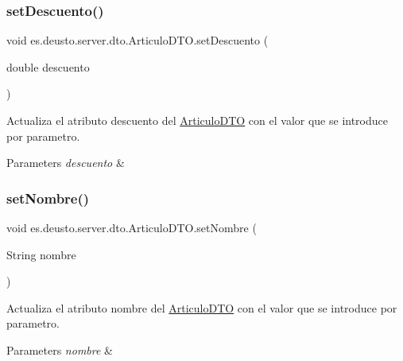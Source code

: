 \subsubsection{\texorpdfstring{setDescuento()}{setDescuento()}}
{\footnotesize\ttfamily void es.\+deusto.\+server.\+dto.\+Articulo\+D\+T\+O.\+set\+Descuento (\begin{DoxyParamCaption}\item[{double}]{descuento }\end{DoxyParamCaption})}

Actualiza el atributo descuento del \mbox{\hyperlink{classes_1_1deusto_1_1server_1_1dto_1_1_articulo_d_t_o}{Articulo\+D\+TO}} con el valor que se introduce por parametro. 
\begin{DoxyParams}{Parameters}
{\em descuento} & \\
\hline
\end{DoxyParams}
\mbox{\label{classes_1_1deusto_1_1server_1_1dto_1_1_articulo_d_t_o_a9e9a4e45fb1538231674660fcb5ca4e1}} 
\subsubsection{\texorpdfstring{setNombre()}{setNombre()}}
{\footnotesize\ttfamily void es.\+deusto.\+server.\+dto.\+Articulo\+D\+T\+O.\+set\+Nombre (\begin{DoxyParamCaption}\item[{String}]{nombre }\end{DoxyParamCaption})}

Actualiza el atributo nombre del \mbox{\hyperlink{classes_1_1deusto_1_1server_1_1dto_1_1_articulo_d_t_o}{Articulo\+D\+TO}} con el valor que se introduce por parametro. 
\begin{DoxyParams}{Parameters}
{\em nombre} & \\
\hline
\end{DoxyParams}
\mbox{\label{classes_1_1deusto_1_1server_1_1dto_1_1_articulo_d_t_o_a11825b551df1daabf677064a2cc1e5a4}} 
